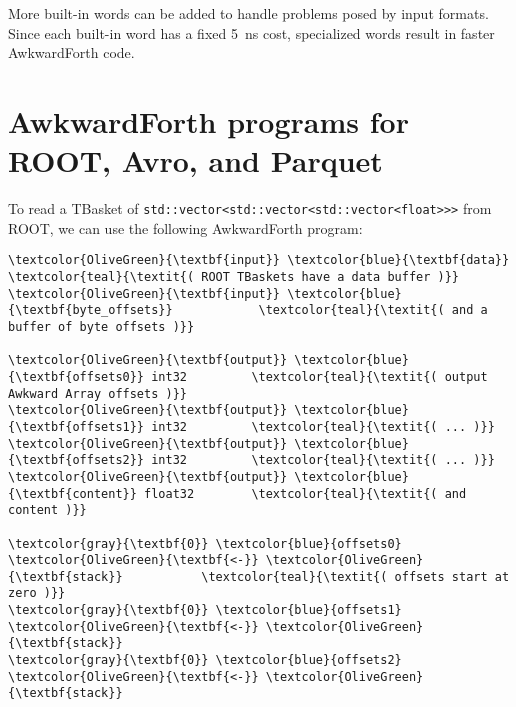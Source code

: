 \documentclass{webofc}
\begin{document}
More built-in words can be added to handle problems posed by input formats. Since each built-in word has a fixed 5~ns cost, specialized words result in faster AwkwardForth code.

\section{AwkwardForth programs for ROOT, Avro, and Parquet}

To read a TBasket of \texttt{std::vector<std::vector<std::vector<float>>>} from ROOT, we can use the following AwkwardForth program:

\begin{Verbatim}[commandchars=\\\{\}]
\textcolor{OliveGreen}{\textbf{input}} \textcolor{blue}{\textbf{data}}                    \textcolor{teal}{\textit{( ROOT TBaskets have a data buffer )}}
\textcolor{OliveGreen}{\textbf{input}} \textcolor{blue}{\textbf{byte_offsets}}            \textcolor{teal}{\textit{( and a buffer of byte offsets )}}

\textcolor{OliveGreen}{\textbf{output}} \textcolor{blue}{\textbf{offsets0}} int32         \textcolor{teal}{\textit{( output Awkward Array offsets )}}
\textcolor{OliveGreen}{\textbf{output}} \textcolor{blue}{\textbf{offsets1}} int32         \textcolor{teal}{\textit{( ... )}}
\textcolor{OliveGreen}{\textbf{output}} \textcolor{blue}{\textbf{offsets2}} int32         \textcolor{teal}{\textit{( ... )}}
\textcolor{OliveGreen}{\textbf{output}} \textcolor{blue}{\textbf{content}} float32        \textcolor{teal}{\textit{( and content )}}

\textcolor{gray}{\textbf{0}} \textcolor{blue}{offsets0} \textcolor{OliveGreen}{\textbf{<-}} \textcolor{OliveGreen}{\textbf{stack}}           \textcolor{teal}{\textit{( offsets start at zero )}}
\textcolor{gray}{\textbf{0}} \textcolor{blue}{offsets1} \textcolor{OliveGreen}{\textbf{<-}} \textcolor{OliveGreen}{\textbf{stack}}
\textcolor{gray}{\textbf{0}} \textcolor{blue}{offsets2} \textcolor{OliveGreen}{\textbf{<-}} \textcolor{OliveGreen}{\textbf{stack}}


\end{Verbatim}
\end{document}
